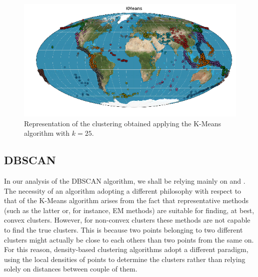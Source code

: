 \documentclass[a4paper]{article}
\begin{document}
	\begin{figure}[H]
		\includegraphics[width=\linewidth]{kmeans_world.png}
		\caption{Representation of the clustering obtained applying the K-Means algorithm with $k= 25$.}
		\label{fig:kmeans_world}
	\end{figure}

	\subsection{DBSCAN}
	In our analysis of the DBSCAN algorithm, we shall be relying mainly on \cite{Ester96adensity-based} and \cite{zaki2014dataminingbook}. The necessity of an algorithm adopting a different philosophy with respect to that of the K-Means algorithm arises from the fact that representative methods (such as the latter or, for instance, EM methods) are suitable for finding, at best, convex clusters.
	However, for non-convex clusters these methods are not capable to find the true clusters. This is because two points belonging to two different clusters might actually be close to each others than two points from the same on.
	For this reason, density-based clustering algorithms adopt a different paradigm, using the local densities of points to determine the clusters rather than relying solely on distances between couple of them.
\end{document}
